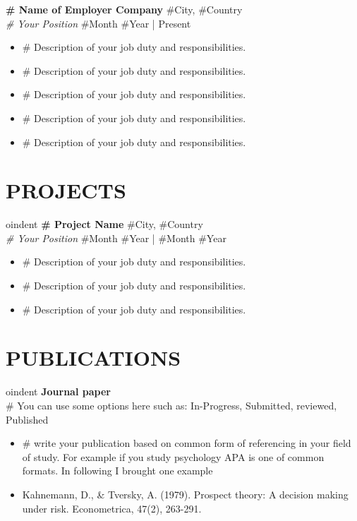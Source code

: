 \documentclass[a4paper,9pt]{extarticle}
\begin{document}
\textbf{\# Name of Employer Company} \hfill \#City, \#Country\\ %
\textit{\# Your Position} \hfill \#Month \#Year | Present %
\begin{itemize}
    \item \# Description of your job duty and responsibilities.
    \item \# Description of your job duty and responsibilities.
    \item \# Description of your job duty and responsibilities.
    \item \# Description of your job duty and responsibilities.
    \item \# Description of your job duty and responsibilities.
\end{itemize}

\section*{PROJECTS}

oindent
\textbf{\# Project Name} \hfill \#City, \#Country\\ %
\textit{\# Your Position}
   \hfill \#Month \#Year | \#Month \#Year %

\begin{itemize}
     \item \# Description of your job duty and responsibilities.
    \item \# Description of your job duty and responsibilities.
    \item \# Description of your job duty and responsibilities.
\end{itemize}

\section*{PUBLICATIONS}

oindent
\textbf{Journal paper}\\
\textup{\# You can use some options here such as: In-Progress, Submitted, reviewed, Published}%
\begin{itemize}
    \item \# write your publication based on common form of referencing in your field of study. For example if you study psychology APA is one of common formats. In following I brought one example
    \item Kahnemann, D., \& Tversky, A. (1979). Prospect theory: A decision making under risk. Econometrica, 47(2), 263-291.
\end{itemize}
\end{document}
